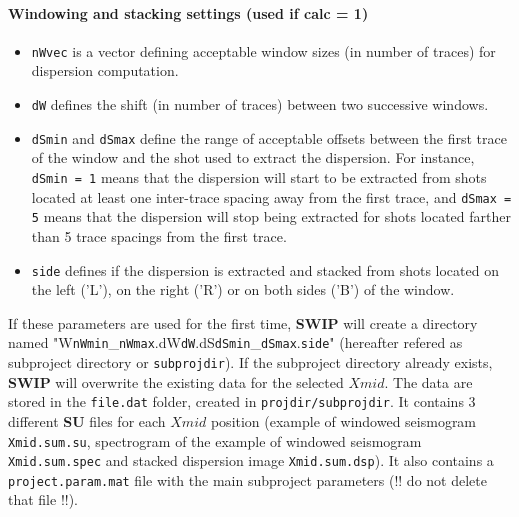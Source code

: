 \documentclass[twoside,a4paper]{article}
\def\SWIP{\textbf{SWIP}}
\def\SU{\textbf{SU}}
\begin{document}
\paragraph{Windowing and stacking settings (used if calc = 1)}
\begin{itemize}[leftmargin=*]
\setlength\itemsep{2ex}
\item \verb|nWvec| is a vector defining acceptable window sizes (in number of traces) for dispersion computation.

\item \verb|dW| defines the shift (in number of traces) between two successive windows.

\item \verb|dSmin| and \verb|dSmax| define the range of acceptable offsets between the first trace of the window and the shot used to extract the dispersion. For instance, \verb|dSmin = 1| means that the dispersion will start to be extracted from shots located at least one inter-trace spacing away from the first trace, and \verb|dSmax = 5| means that the dispersion will stop being extracted for shots located farther than 5 trace spacings from the first trace.

\item \verb|side| defines if the dispersion is extracted and stacked from shots located on the left ('L'), on the right ('R') or on both sides ('B') of the window.
\end{itemize}

If these parameters are used for the first time, {\SWIP} will create a directory named "W\verb|nWmin|\_\verb|nWmax|.dW\verb|dW|.dS\verb|dSmin|\_\verb|dSmax|.\verb|side|" (hereafter refered as subproject directory or \verb|subprojdir|). If the subproject directory already exists, {\SWIP} will overwrite the existing data for the selected $Xmid$. The data  are stored in the \verb|file.dat| folder, created in \verb|projdir/subprojdir|. It contains 3 different {\SU} files for each $Xmid$ position (example of windowed seismogram \verb|Xmid.sum.su|, spectrogram of the example of windowed seismogram \verb|Xmid.sum.spec| and stacked dispersion image \verb|Xmid.sum.dsp|). It also contains a \verb|project.param.mat| file with the main subproject parameters (!! do not delete that file !!).
\end{document}
